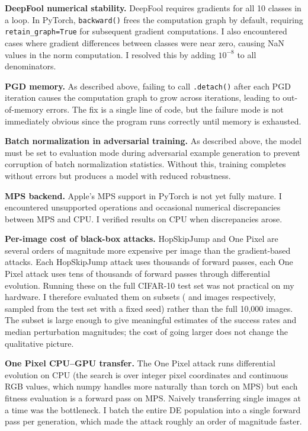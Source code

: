 \textbf{DeepFool numerical stability.} DeepFool requires gradients for all 10 classes in a loop. In PyTorch, \texttt{backward()} frees the computation graph by default, requiring \texttt{retain\_graph=True} for subsequent gradient computations. I also encountered cases where gradient differences between classes were near zero, causing NaN values in the norm computation. I resolved this by adding $10^{-8}$ to all denominators.

\textbf{PGD memory.} As described above, failing to call \texttt{.detach()} after each PGD iteration causes the computation graph to grow across iterations, leading to out-of-memory errors. The fix is a single line of code, but the failure mode is not immediately obvious since the program runs correctly until memory is exhausted.

\textbf{Batch normalization in adversarial training.} As described above, the model must be set to evaluation mode during adversarial example generation to prevent corruption of batch normalization statistics. Without this, training completes without errors but produces a model with reduced robustness.

\textbf{MPS backend.} Apple's MPS support in PyTorch is not yet fully mature. I encountered unsupported operations and occasional numerical discrepancies between MPS and CPU. I verified results on CPU when discrepancies arose.

\textbf{Per-image cost of black-box attacks.} HopSkipJump and One Pixel are several orders of magnitude more expensive per image than the gradient-based attacks. Each HopSkipJump attack uses thousands of forward passes, each One Pixel attack uses tens of thousands of forward passes through differential evolution. Running these on the full CIFAR-10 test set was not practical on my hardware. I therefore evaluated them on subsets (\HSJN{} and \OPN{} images respectively, sampled from the test set with a fixed seed) rather than the full 10,000 images. The subset is large enough to give meaningful estimates of the success rates and median perturbation magnitudes; the cost of going larger does not change the qualitative picture.

\textbf{One Pixel CPU--GPU transfer.} The One Pixel attack runs differential evolution on CPU (the search is over integer pixel coordinates and continuous RGB values, which numpy handles more naturally than torch on MPS) but each fitness evaluation is a forward pass on MPS. Naively transferring single images at a time was the bottleneck. I batch the entire DE population into a single forward pass per generation, which made the attack roughly an order of magnitude faster.

